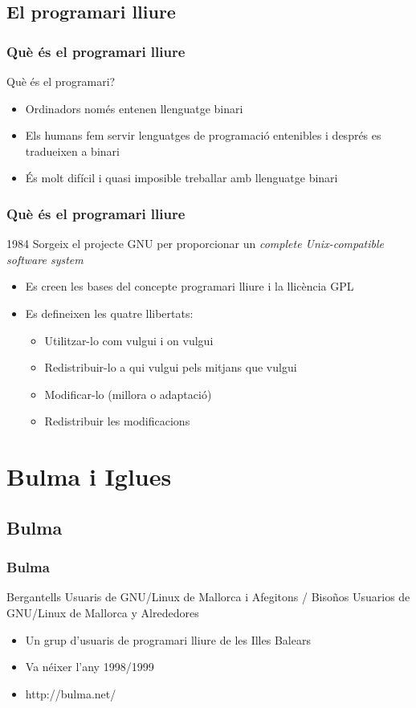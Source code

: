 \documentclass{beamer}
\begin{document}
\subsection{El programari lliure}
\begin{frame}\frametitle{Què és el programari lliure} 
Què és el programari?
\begin{itemize}
\item Ordinadors només entenen llenguatge binari
\item Els humans fem servir lenguatges de programació entenibles i després
es tradueixen a binari
\item És molt difícil i quasi imposible treballar amb llenguatge binari
\end{itemize} 
\end{frame}

\begin{frame}\frametitle{Què és el programari lliure} 
1984 Sorgeix el projecte GNU per proporcionar un \textit{complete Unix-compatible software system}
\begin{itemize}
\item Es creen les bases del concepte programari lliure i la llicència GPL
\item Es defineixen les quatre llibertats: 
\begin{itemize}
 \item Utilitzar-lo com vulgui i on vulgui
 \item Redistribuir-lo a qui vulgui pels mitjans que vulgui
 \item Modificar-lo (millora o adaptació)
 \item Redistribuir les modificacions
\end{itemize} \end{itemize} 
\end{frame}



\section{Bulma i Iglues} 
\subsection{Bulma}
\begin{frame}\frametitle{Bulma} 
Bergantells Usuaris de GNU/Linux de Mallorca i Afegitons / Bisoños Usuarios de GNU/Linux de Mallorca y Alrededores
\begin{itemize}
\item Un grup d'usuaris de programari lliure de les Illes Balears
\item Va néixer l'any 1998/1999
\item http://bulma.net/
\end{itemize}
\end{frame}
\end{document}
